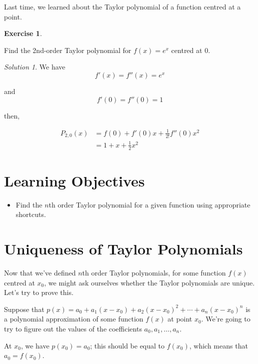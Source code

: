 \documentclass[
]{book}
\providecommand{\tightlist}{%
  \setlength{\itemsep}{0pt}\setlength{\parskip}{0pt}}
\theoremstyle{definition}
\theoremstyle{definition}
\theoremstyle{definition}
\newtheorem{exercise}{Exercise}[chapter]
\theoremstyle{definition}
\theoremstyle{remark}
\newtheorem*{solution}{Solution}
\begin{document}
Last time, we learned about the Taylor polynomial of a function centred at a point.

\begin{exercise}
\protect\hypertarget{exr:unlabeled-div-152}{}\label{exr:unlabeled-div-152}

Find the 2nd-order Taylor polynomial for \(f(x)=e^x\) centred at \(0\).

\end{exercise}

\begin{solution}

We have \[f'(x)=f''(x)=e^x\]

and \[f'(0)=f''(0)=1\]

then,

\begin{align*}
P_{2,0}(x) &= f(0)+f'(0) x + \frac{1}{2!}f''(0)x^2\\
&= 1+x+\frac{1}{2}x^2
\end{align*}

\end{solution}

\hypertarget{learning-objectives-20}{%
\section{Learning Objectives}\label{learning-objectives-20}}

\begin{itemize}
\tightlist
\item
  Find the \(n\)th order Taylor polynomial for a given function using appropriate shortcuts.
\end{itemize}

\hypertarget{uniqueness-of-taylor-polynomials}{%
\section{Uniqueness of Taylor Polynomials}\label{uniqueness-of-taylor-polynomials}}

Now that we've defined \(n\)th order Taylor polynomials, for some function \(f(x)\) centred at \(x_0\), we might ask ourselves whether the Taylor polynomials are unique. Let's try to prove this.

Suppose that \(p(x)=a_0+a_1(x-x_0)+a_2(x-x_0)^2+\cdots +a_n(x-x_0)^n\) is a polynomial approximation of some function \(f(x)\) at point \(x_0\). We're going to try to figure out the values of the coefficients \(a_0, a_1,\ldots, a_n\).

At \(x_0\), we have \(p(x_0)=a_0\); this should be equal to \(f(x_0)\), which means that \(a_0=f(x_0)\).
\end{document}
